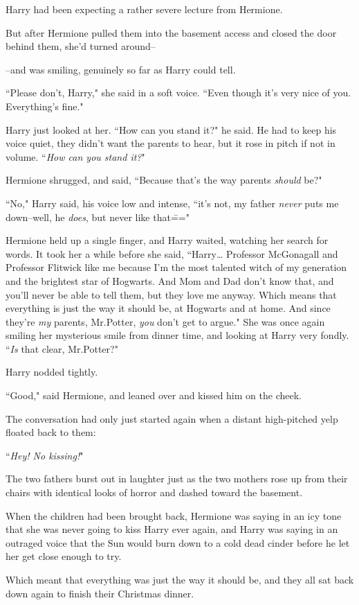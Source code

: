Harry had been expecting a rather severe lecture from Hermione.

But after Hermione pulled them into the basement access and closed the door behind them, she'd turned around\---

\---and was smiling, genuinely so far as Harry could tell.

``Please don't, Harry," she said in a soft voice. ``Even though it's very nice of you. Everything's fine."

Harry just looked at her. ``How can you stand it?" he said. He had to keep his voice quiet, they didn't want the parents to hear, but it rose in pitch if not in volume. ``\emph{How can you stand it?}"

Hermione shrugged, and said, ``Because that's the way parents \emph{should} be?"

``No," Harry said, his voice low and intense, ``it's not, my father \emph{never} puts me down\---well, he \emph{does}, but never like that\==="

Hermione held up a single finger, and Harry waited, watching her search for words. It took her a while before she said, ``Harry{\ldots} Professor McGonagall and Professor Flitwick like me because I'm the most talented witch of my generation and the brightest star of Hogwarts. And Mom and Dad don't know that, and you'll never be able to tell them, but they love me anyway. Which means that everything is just the way it should be, at Hogwarts and at home. And since they're \emph{my} parents, Mr.\?Potter, \emph{you} don't get to argue." She was once again smiling her mysterious smile from dinner time, and looking at Harry very fondly. ``\emph{Is} that clear, Mr.\?Potter?"

Harry nodded tightly.

``Good," said Hermione, and leaned over and kissed him on the cheek.

\later

The conversation had only just started again when a distant high-pitched yelp floated back to them:

``\emph{Hey! No kissing!}"

The two fathers burst out in laughter just as the two mothers rose up from their chairs with identical looks of horror and dashed toward the basement.

When the children had been brought back, Hermione was saying in an icy tone that she was never going to kiss Harry ever again, and Harry was saying in an outraged voice that the Sun would burn down to a cold dead cinder before he let her get close enough to try.

Which meant that everything was just the way it should be, and they all sat back down again to finish their Christmas dinner.

